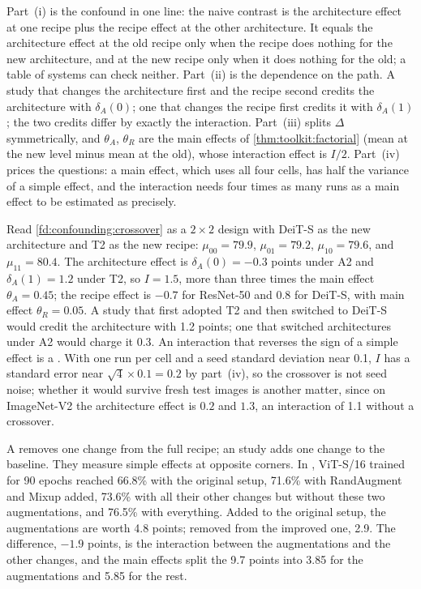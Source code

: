 \begin{refsection}
Part~(i) is the confound in one line: the naive contrast is the architecture effect at one recipe plus the recipe effect at the other architecture. It equals the architecture effect at the old recipe only when the recipe does nothing for the new architecture, and at the new recipe only when it does nothing for the old; a table of systems can check neither. Part~(ii) is the dependence on the path. A study that changes the architecture first and the recipe second credits the architecture with $\delta_A(0)$; one that changes the recipe first credits it with $\delta_A(1)$; the two credits differ by exactly the interaction. Part~(iii) splits $\Delta$ symmetrically, and $\theta_A$, $\theta_R$ are the main effects of \cref{thm:toolkit:factorial} (mean at the new level minus mean at the old), whose interaction effect is $I/2$. Part~(iv) prices the questions: a main effect, which uses all four cells, has half the variance of a simple effect, and the interaction needs four times as many runs as a main effect to be estimated as precisely.

\begin{example}\label{exa:confounding:crossover}
Read \cref{fd:confounding:crossover} as a $2\times2$ design with DeiT-S as the new architecture and T2 as the new recipe: $\mu_{00}=79.9$, $\mu_{01}=79.2$, $\mu_{10}=79.6$, and $\mu_{11}=80.4$. The architecture effect is $\delta_A(0)=-0.3$ points under A2 and $\delta_A(1)=1.2$ under T2, so $I=1.5$, more than three times the main effect $\theta_A=0.45$; the recipe effect is $-0.7$ for ResNet-50 and $0.8$ for DeiT-S, with main effect $\theta_R=0.05$. A study that first adopted T2 and then switched to DeiT-S would credit the architecture with 1.2 points; one that switched architectures under A2 would charge it 0.3. An interaction that reverses the sign of a simple effect is a . With one run per cell and a seed standard deviation near 0.1, $I$ has a standard error near $\sqrt4\times0.1=0.2$ by part~(iv), so the crossover is not seed noise; whether it would survive fresh test images is another matter, since on ImageNet-V2 the architecture effect is $0.2$ and $1.3$, an interaction of 1.1 without a crossover.
\end{example}

\begin{example}\label{exa:confounding:loo}
A  removes one change from the full recipe; an  study adds one change to the baseline. They measure simple effects at opposite corners. In \textcite{BeyerZhaiKolesnikov2022}, ViT-S/16 trained for 90 epochs reached 66.8\% with the original setup, 71.6\% with RandAugment and Mixup added, 73.6\% with all their other changes but without these two augmentations, and 76.5\% with everything. Added to the original setup, the augmentations are worth 4.8 points; removed from the improved one, 2.9. The difference, $-1.9$ points, is the interaction between the augmentations and the other changes, and the main effects split the 9.7 points into 3.85 for the augmentations and 5.85 for the rest.
\end{example}


\end{refsection}
